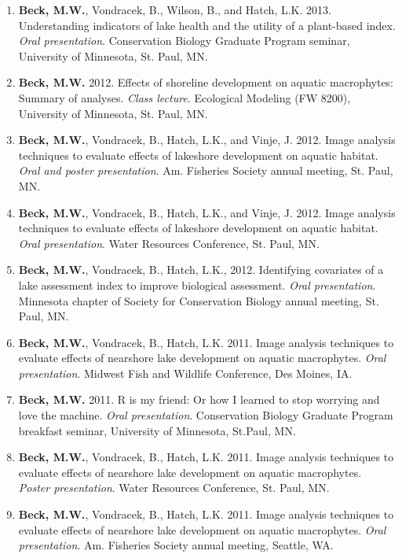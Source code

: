 \documentclass[letterpaper,12pt]{article}
\begin{document}
\begin{enumerate}
\item {\bf Beck, M.W.}, Vondracek, B., Wilson, B., and Hatch, L.K. 2013. Understanding indicators of lake health and the utility of a plant-based index. \textit{Oral presentation}. Conservation Biology Graduate Program seminar, University of Minnesota, St. Paul, MN.

\item {\bf Beck, M.W.} 2012. Effects of shoreline development on aquatic macrophytes: Summary of analyses. \textit{Class lecture}. Ecological Modeling (FW 8200), University of Minnesota, St. Paul, MN.

\item {\bf Beck, M.W.}, Vondracek, B., Hatch, L.K., and Vinje, J. 2012. Image analysis techniques to evaluate effects of lakeshore development on aquatic habitat. \textit{Oral and poster presentation}. Am. Fisheries Society annual meeting, St. Paul, MN.

\item {\bf Beck, M.W.}, Vondracek, B., Hatch, L.K., and Vinje, J. 2012. Image analysis techniques to evaluate effects of lakeshore development on aquatic habitat. \textit{Oral presentation}. Water Resources Conference, St. Paul, MN.

\item {\bf Beck, M.W.}, Vondracek, B., Hatch, L.K., 2012. Identifying covariates of a lake assessment index to improve biological assessment. \textit{Oral presentation}. Minnesota chapter of Society for Conservation Biology annual meeting, St. Paul, MN.

\item {\bf Beck, M.W.}, Vondracek, B., Hatch, L.K. 2011. Image analysis techniques to evaluate effects of nearshore lake development on aquatic macrophytes. \textit{Oral presentation}. Midwest Fish and Wildlife Conference, Des Moines, IA.

\item {\bf Beck, M.W.} 2011. R is my friend: Or how I learned to stop worrying and love the machine. \textit{Oral presentation}. Conservation Biology Graduate Program breakfast seminar, University of Minnesota, St.Paul, MN.

\item {\bf Beck, M.W.}, Vondracek, B., Hatch, L.K. 2011. Image analysis techniques to evaluate effects of nearshore lake development on aquatic macrophytes. \textit{Poster presentation}. Water Resources Conference, St. Paul, MN.

\item {\bf Beck, M.W.}, Vondracek, B., Hatch, L.K. 2011. Image analysis techniques to evaluate effects of nearshore lake development on aquatic macrophytes. \textit{Oral presentation}. Am. Fisheries Society annual meeting, Seattle, WA.


\end{enumerate}
\end{document}
